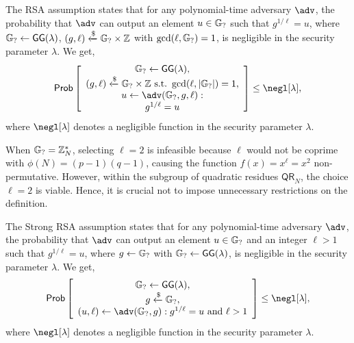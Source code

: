 \documentclass{iacrcc}
\begin{document}
\begin{definition}
The RSA assumption states that for any polynomial-time adversary $\adv$, the probability that $\adv$ can output an element $u \in \mathbb{G}_{?}$ such that $g^{1/\ell} = u$, where $\mathbb{G}_{?} \leftarrow \mathsf{GG}(\lambda)$, $(g, \ell) \xleftarrow{\$} \mathbb{G}_{?} \times \mathbb{Z}$ with $\gcd(\ell, \mathbb{G}_{?})=1$, is negligible in the security parameter $\lambda$. We get,
\[
\Pr
\left[
\begin{array}{c}
\hidgrp \leftarrow \mathsf{GG}(\lambda),                                                     \\
(g, \ell) \xleftarrow{\$} \hidgrp \times \mathbb{Z} \ \text{s.t.} \ \gcd(\ell, |\hidgrp|)=1, \\
u \leftarrow \adv(\hidgrp, g, \ell) :                                                        \\
g^{1/\ell} = u
\end{array}
\right] \leq \negl[\lambda],
\]
where $\negl[\lambda]$ denotes a negligible function in the security parameter $\lambda$.
\end{definition}

When \(\mathbb{G}_{?} = \mathbb{Z}_N^{*}\), selecting \(\ell = 2\) is infeasible because \(\ell\) would not be coprime with \(\phi(N) = (p-1)(q-1)\), causing the function \(f(x) = x^\ell = x^2\) non-permutative. However, within the subgroup of quadratic residues \(\mathsf{QR}_N\), the choice \(\ell = 2\) is viable. Hence, it is crucial not to impose unnecessary restrictions on the definition.

\begin{definition}
The Strong RSA assumption states that for any polynomial-time adversary $\adv$, the probability that $\adv$ can output an element $u \in \mathbb{G}_{?}$ and an integer $\ell > 1$ such that $g^{1/\ell} = u$, where $g \leftarrow \mathbb{G}_{?}$ with $\mathbb{G}_{?} \leftarrow \mathsf{GG}(\lambda)$, is negligible in the security parameter $\lambda$. We get,
\[
\Pr
\left[
\begin{array}{c}
\hidgrp \leftarrow \mathsf{GG}(\lambda),                                       \\
g \xleftarrow{\$} \hidgrp,                                                     \\
(u, \ell) \leftarrow \adv(\hidgrp, g) : g^{1/\ell} = u \ \text{and} \ \ell > 1
\end{array}
\right] \leq \negl[\lambda],
\]
where $\negl[\lambda]$ denotes a negligible function in the security parameter $\lambda$.
\end{definition}
\end{document}
